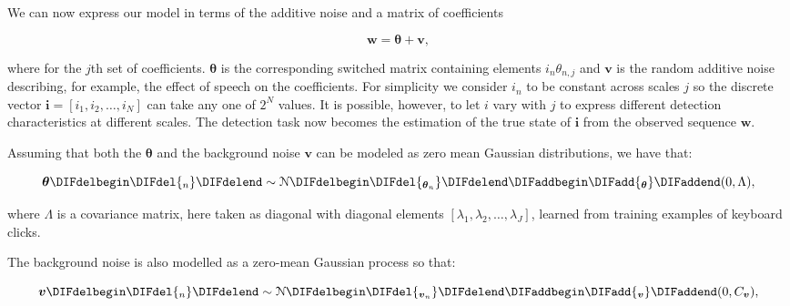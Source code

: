 We can now express our model in terms of the additive noise and a matrix of coefficients

\begin{equation}\label{eq:model2}
\boldsymbol{w} = \boldsymbol{\theta} + \boldsymbol{v},
\end{equation}

where \DIFdelbegin {}\DIFdelend \DIFaddbegin {}\DIFaddend for the $j$th set of coefficients. $\boldsymbol{\theta}$ is the corresponding switched \DIFdelbegin {}\DIFdelend \DIFaddbegin {}\DIFaddend matrix containing elements $i_{n}\theta_{n,j}$ and $\boldsymbol{v}$ is the random additive noise describing, for example, the effect of speech on the coefficients. For simplicity we consider $i_{n}$ to be constant across scales $j$ so the discrete vector $\boldsymbol{i} = [i_{1}, i_{2}, \ldots, i_{N}]$ can take any one of $2^{N}$ values. It is possible, however, to let $i$ vary with $j$ to express different detection characteristics at different scales. The detection task now becomes the estimation of the true state of $\boldsymbol{i}$ from the observed sequence $\boldsymbol{w}$.

Assuming that both the \DIFdelbegin {}\DIFdelend \DIFaddbegin {}\DIFaddend $\boldsymbol{\theta}$ and the background noise $\boldsymbol{v}$ can be modeled as zero mean Gaussian distributions, we have that:

\begin{equation}\label{eq:burst}
\boldsymbol{\theta} \DIFdelbegin \DIFdel{_n }\DIFdelend \sim \mathcal{N}\DIFdelbegin \DIFdel{_{\boldsymbol{\theta}_n}}\DIFdelend \DIFaddbegin \DIFadd{_{\boldsymbol{\theta}}}\DIFaddend (0,\Lambda),
\end{equation}

where $\Lambda$ is a covariance matrix, here taken as diagonal with diagonal elements $\left[\lambda_{1}, \lambda_{2}, \ldots, \lambda_{J}\right]$, learned from training examples of keyboard clicks.

The background noise is also modelled as a zero-mean Gaussian process so that:

\begin{equation}\label{eq:noise}
\boldsymbol{v} \DIFdelbegin \DIFdel{_n }\DIFdelend \sim \mathcal{N}\DIFdelbegin \DIFdel{_{\boldsymbol{v}_n}}\DIFdelend \DIFaddbegin \DIFadd{_{\boldsymbol{v}}}\DIFaddend (0,C_{\boldsymbol{v}}),
\end{equation}

